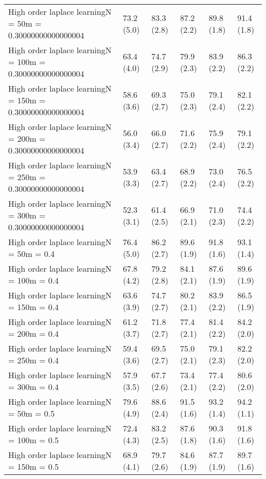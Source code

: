 \documentclass{article}
\begin{document}
\begin{table*}[t!]
\begin{center}
\begin{small}
\begin{sc}
\begin{tabular}{llllll}
High order laplace learningN = 50m = 0.30000000000000004&73.2 (5.0)      &83.3 (2.8)      &87.2 (2.2)      &89.8 (1.8)      &91.4 (1.8)      \\
High order laplace learningN = 100m = 0.30000000000000004&63.4 (4.0)      &74.7 (2.9)      &79.9 (2.3)      &83.9 (2.2)      &86.3 (2.2)      \\
High order laplace learningN = 150m = 0.30000000000000004&58.6 (3.6)      &69.3 (2.7)      &75.0 (2.3)      &79.1 (2.4)      &82.1 (2.2)      \\
High order laplace learningN = 200m = 0.30000000000000004&56.0 (3.4)      &66.0 (2.7)      &71.6 (2.2)      &75.9 (2.4)      &79.1 (2.2)      \\
High order laplace learningN = 250m = 0.30000000000000004&53.9 (3.3)      &63.4 (2.7)      &68.9 (2.2)      &73.0 (2.4)      &76.5 (2.2)      \\
High order laplace learningN = 300m = 0.30000000000000004&52.3 (3.1)      &61.4 (2.5)      &66.9 (2.1)      &71.0 (2.3)      &74.4 (2.2)      \\
High order laplace learningN = 50m = 0.4&76.4 (5.0)      &86.2 (2.7)      &89.6 (1.9)      &91.8 (1.6)      &93.1 (1.4)      \\
High order laplace learningN = 100m = 0.4&67.8 (4.2)      &79.2 (2.8)      &84.1 (2.1)      &87.6 (1.9)      &89.6 (1.9)      \\
High order laplace learningN = 150m = 0.4&63.6 (3.9)      &74.7 (2.7)      &80.2 (2.1)      &83.9 (2.2)      &86.5 (1.9)      \\
High order laplace learningN = 200m = 0.4&61.2 (3.7)      &71.8 (2.7)      &77.4 (2.1)      &81.4 (2.2)      &84.2 (2.0)      \\
High order laplace learningN = 250m = 0.4&59.4 (3.6)      &69.5 (2.7)      &75.0 (2.1)      &79.1 (2.3)      &82.2 (2.0)      \\
High order laplace learningN = 300m = 0.4&57.9 (3.5)      &67.7 (2.6)      &73.4 (2.1)      &77.4 (2.2)      &80.6 (2.0)      \\
High order laplace learningN = 50m = 0.5&79.6 (4.9)      &88.6 (2.4)      &91.5 (1.6)      &93.2 (1.4)      &94.2 (1.1)      \\
High order laplace learningN = 100m = 0.5&72.4 (4.3)      &83.2 (2.5)      &87.6 (1.8)      &90.3 (1.6)      &91.8 (1.6)      \\
High order laplace learningN = 150m = 0.5&68.9 (4.1)      &79.7 (2.6)      &84.6 (1.9)      &87.7 (1.9)      &89.7 (1.6)      \\

\end{tabular}
\end{sc}
\end{small}
\end{center}
\end{table*}
\end{document}
